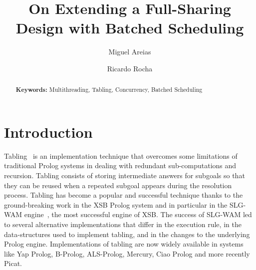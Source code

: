 \documentclass{llncs}
\begin{document}
\title{On Extending a Full-Sharing Design with Batched Scheduling}

\author{Miguel Areias \and Ricardo Rocha}


\maketitle


\begin{abstract}

  \textbf{Keywords:} Multithreading, Tabling, Concurrency, Batched
  Scheduling
\end{abstract}

\section{Introduction}

Tabling~\cite{Chen-96} is an implementation technique that overcomes
some limitations of traditional Prolog systems in dealing with
redundant sub-computations and recursion. Tabling consists of storing
intermediate answers for subgoals so that they can be reused when a
repeated subgoal appears during the resolution process. Tabling has
become a popular and successful technique thanks to the
ground-breaking work in the XSB Prolog system and in particular in the
SLG-WAM engine~\cite{Sagonas-98}, the most successful engine of
XSB. The success of SLG-WAM led to several alternative implementations
that differ in the execution rule, in the data-structures used to
implement tabling, and in the changes to the underlying Prolog
engine. Implementations of tabling are now widely available in systems
like Yap Prolog, B-Prolog, ALS-Prolog, Mercury, Ciao Prolog and more
recently Picat. 
\end{document}
